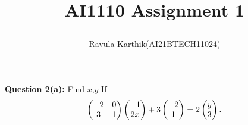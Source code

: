 \documentclass[journal,12pt,twocolumn]{IEEEtran}
\begin{document}
	\let\StandardTheFigure\thefigure
	\let\vec\mathbf
	
		
		
		
		\def\putbox#1#2#3{\makebox[0in][l]{\makebox[#1][l]{}\raisebox{\baselineskip}[0in][0in]{\raisebox{#2}[0in][0in]{#3}}}}
		\def\rightbox#1{\makebox[0in][r]{#1}}
		\def\centbox#1{\makebox[0in]{#1}}
		\def\topbox#1{\raisebox{-\baselineskip}[0in][0in]{#1}}
		\def\midbox#1{\raisebox{-0.5\baselineskip}[0in][0in]{#1}}
	
		
		\title{
			AI1110 Assignment 1 
                        
		}
		\author{ 
		    Ravula Karthik(AI21BTECH11024)
		}	
		
\maketitle
\newpage
\bigskip
\textbf{Question 2(a):}
 Find $x$,$ y $       
       If 
       \begin{align}
       \begin{pmatrix}-2 & 0\\3 & 1\end{pmatrix}
       \begin{pmatrix}-1\\2x\end{pmatrix} +3  
       \begin{pmatrix}-2 \\1 \end{pmatrix} =2 
       \begin{pmatrix}y \\3 \end{pmatrix} .
        \end{align}
 
\end{document}

